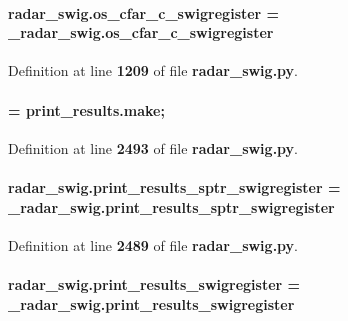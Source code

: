 \paragraph[{os\+\_\+cfar\+\_\+c\+\_\+swigregister}]{\setlength{\rightskip}{0pt plus 5cm}radar\+\_\+swig.\+os\+\_\+cfar\+\_\+c\+\_\+swigregister = \+\_\+radar\+\_\+swig.\+os\+\_\+cfar\+\_\+c\+\_\+swigregister}\label{namespaceradar__swig_a9993c49e6ee8f50cbf37f4b8d72927e7}


Definition at line {\bf 1209} of file {\bf radar\+\_\+swig.\+py}.

\paragraph[{print\+\_\+results}]{ = {\bf print\+\_\+results.\+make};}\label{namespaceradar__swig_a70dae62e06fc5a4f33ac94a968a8af52}


Definition at line {\bf 2493} of file {\bf radar\+\_\+swig.\+py}.

\paragraph[{print\+\_\+results\+\_\+sptr\+\_\+swigregister}]{\setlength{\rightskip}{0pt plus 5cm}radar\+\_\+swig.\+print\+\_\+results\+\_\+sptr\+\_\+swigregister = \+\_\+radar\+\_\+swig.\+print\+\_\+results\+\_\+sptr\+\_\+swigregister}\label{namespaceradar__swig_abc03e629010e644f0f2a5216ab9e9b69}


Definition at line {\bf 2489} of file {\bf radar\+\_\+swig.\+py}.

\paragraph[{print\+\_\+results\+\_\+swigregister}]{\setlength{\rightskip}{0pt plus 5cm}radar\+\_\+swig.\+print\+\_\+results\+\_\+swigregister = \+\_\+radar\+\_\+swig.\+print\+\_\+results\+\_\+swigregister}\label{namespaceradar__swig_a0ec8d74bfd75e9e1bfa344fe8c36c8cb}


